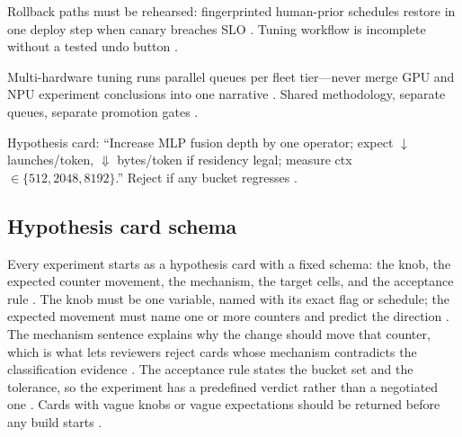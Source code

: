 Rollback paths must be rehearsed: fingerprinted human-prior schedules restore in one deploy step when canary breaches SLO \citep{yirage2026,chen2020compilerbasedhardw,kwon2023vllm,patel2025llminference,memoryfloor2026,taxbreak2026,liu2024deepseekv3,amd2024aie,dlbook,semianalysis2024tma,amd2024xdna,dao2022flashattention,dao2023flashdecoding,nvidia2024cudagraphs,nvidia2022hopper}. Tuning workflow is incomplete without a tested undo button \citep{patel2025llminference,yirage2026,chen2020compilerbasedhardw,memoryfloor2026,taxbreak2026,amd2024aie,dlbook,kwon2023vllm,liu2024deepseekv3,semianalysis2024tma,amd2024xdna,dao2022flashattention,dao2023flashdecoding,nvidia2024cudagraphs,nvidia2022hopper}.

Multi-hardware tuning runs parallel queues per fleet tier---never merge GPU and NPU experiment conclusions into one narrative \citep{amd2024xdna,amd2024aie,yirage2026,chen2020compilerbasedhardw,patel2025llminference,memoryfloor2026,taxbreak2026,kwon2023vllm,liu2024deepseekv3,dlbook,semianalysis2024tma,dao2022flashattention,dao2023flashdecoding,nvidia2024cudagraphs,nvidia2022hopper}. Shared methodology, separate queues, separate promotion gates \citep{yirage2026,chen2020compilerbasedhardw,patel2025llminference,amd2024aie,dlbook,memoryfloor2026,taxbreak2026,kwon2023vllm,liu2024deepseekv3,semianalysis2024tma,amd2024xdna,dao2022flashattention,dao2023flashdecoding,nvidia2024cudagraphs,nvidia2022hopper}.

\begin{example}
Hypothesis card: ``Increase MLP fusion depth by one operator; expect $\downarrow$ launches/token, $\Downarrow$ bytes/token if residency legal; measure ctx$\in\{512,2048,8192\}$.'' Reject if any bucket regresses \citep{memoryfloor2026,taxbreak2026,yirage2026,nvidia2024cudagraphs,kwon2023vllm}.
\end{example}

\subsection{Hypothesis card schema}

Every experiment starts as a hypothesis card with a fixed schema: the knob, the expected counter movement, the mechanism, the target cells, and the acceptance rule \citep{chen2020compilerbasedhardw,patel2025llminference,memoryfloor2026}. The knob must be one variable, named with its exact flag or schedule; the expected movement must name one or more counters and predict the direction \citep{taxbreak2026,memoryfloor2026}. The mechanism sentence explains why the change should move that counter, which is what lets reviewers reject cards whose mechanism contradicts the classification evidence \citep{patel2025llminference,chen2020compilerbasedhardw}. The acceptance rule states the bucket set and the tolerance, so the experiment has a predefined verdict rather than a negotiated one \citep{memoryfloor2026,taxbreak2026}. Cards with vague knobs or vague expectations should be returned before any build starts \citep{chen2020compilerbasedhardw,patel2025llminference}.

